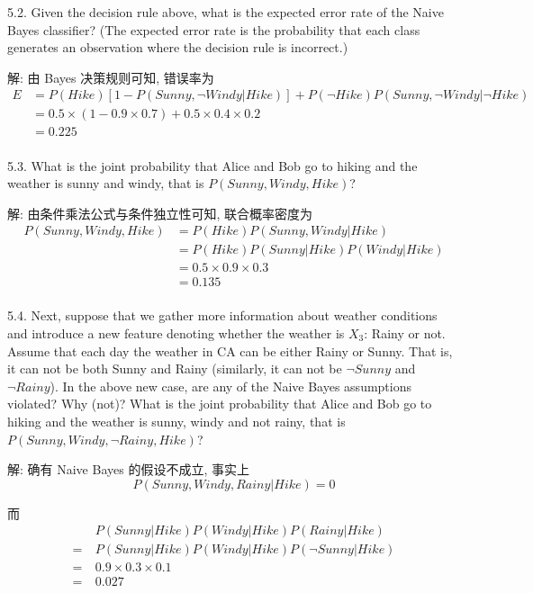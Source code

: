 \documentclass[openany]{ctexbook}
\theoremstyle{kaiti}
\theoremstyle{normal}
\begin{document}
5.2. Given the decision rule above, what is the expected error rate of the Naive Bayes classifier? (The expected error rate is the probability that each class generates an observation where the decision rule is incorrect.)

解: 由 Bayes 决策规则可知, 错误率为
\begin{equation}
  \begin{aligned}
    E
    &=P(Hike)[1-P(Sunny,\neg Windy|Hike)]+P(\neg Hike)P(Sunny,\neg Windy|\neg Hike)\\
    &=0.5\times(1-0.9\times0.7)+0.5\times0.4\times0.2\\
    &=0.225\\
  \end{aligned}
\end{equation}

5.3. What is the joint probability that Alice and Bob go to hiking and the weather is sunny and windy, that is $P(Sunny,Windy,Hike)$?

解: 由条件乘法公式与条件独立性可知, 联合概率密度为
\begin{equation}
  \begin{aligned}
    P(Sunny,Windy,Hike)
    &=P(Hike)P(Sunny,Windy|Hike)\\
    &=P(Hike)P(Sunny|Hike)P(Windy|Hike)\\
    &=0.5 \times 0.9 \times 0.3\\
    &=0.135\\
  \end{aligned}
\end{equation}

5.4. Next, suppose that we gather more information about weather conditions and introduce a new feature denoting whether the weather is $X_3$: Rainy or not. Assume that each day the weather in CA can be either Rainy or Sunny. That is, it can not be both Sunny and Rainy (similarly, it can not be $\neg Sunny$ and $\neg Rainy$). In the above new case, are any of the Naive Bayes assumptions violated? Why (not)? What is the joint probability that Alice and Bob go to hiking and the weather is sunny, windy and not rainy, that is $P(Sunny,Windy,\neg Rainy,Hike)$?

解: 确有 Naive Bayes 的假设不成立, 事实上
\begin{equation}
  P(Sunny,Windy,Rainy|Hike)=0
\end{equation}

而
\begin{equation}
  \begin{aligned}
     &~P(Sunny|Hike)P(Windy|Hike)P(Rainy|Hike)\\
    =&~P(Sunny|Hike)P(Windy|Hike)P(\neg Sunny|Hike)\\
    =&~0.9\times0.3\times0.1\\
    =&~0.027\\
  \end{aligned}
\end{equation}
\end{document}

